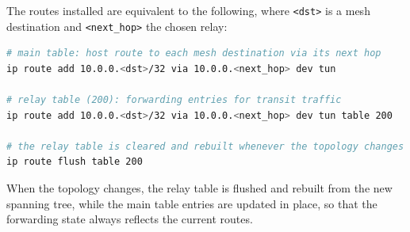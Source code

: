 The routes installed are equivalent to the following, where \texttt{<dst>} is a
mesh destination and \texttt{<next\_hop>} the chosen relay:

\begin{lstlisting}[language=bash,caption={Equivalent routing-table entries (installed via Netlink)},label=lst:app-routes]
# main table: host route to each mesh destination via its next hop
ip route add 10.0.0.<dst>/32 via 10.0.0.<next_hop> dev tun

# relay table (200): forwarding entries for transit traffic
ip route add 10.0.0.<dst>/32 via 10.0.0.<next_hop> dev tun table 200

# the relay table is cleared and rebuilt whenever the topology changes
ip route flush table 200
\end{lstlisting}

When the topology changes, the relay table is flushed and rebuilt from the new
spanning tree, while the main table entries are updated in place, so that the
forwarding state always reflects the current routes.
